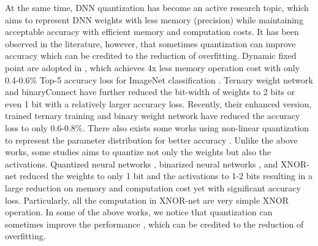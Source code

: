 \documentclass[10pt,twocolumn,letterpaper]{article}
\begin{document}
At the same time, DNN quantization has become an active research topic, which aims to represent DNN weights with less memory (precision) while maintaining acceptable accuracy with efficient memory and computation costs.
It has been observed in the literature, however, that sometimes quantization can improve accuracy which can be credited to the reduction of overfitting.
Dynamic fixed point are adopted in \cite{han2015deep}\cite{hubara2016quantized}, which achieves 4x less memory operation cost with only 0.4-0.6\% Top-5 accuracy loss for ImageNet classification \cite{deng2009imagenet}.
Ternary weight network \cite{li2016ternary} and binaryConnect \cite{courbariaux2015binaryconnect} have further reduced the bit-width of weights to 2 bits or even 1 bit with a relatively larger accuracy loss.
Recently, their enhanced version, trained ternary training \cite{zhu2016trained} and binary weight network \cite{rastegari2016xnor} have reduced the accuracy loss to only 0.6-0.8\%.
There also exists some works using non-linear quantization to represent the parameter distribution for better accuracy \cite{han2015deep}\cite{zhou2017incremental}.
Unlike the above works, some studies aims to quantize not only the weights but also the activations.
Quantized neural networks \cite{hubara2016quantized}, binarized neural networks \cite{courbariauxbinarynet}, and XNOR-net \cite{rastegari2016xnor} reduced the weights to only 1 bit and the activations to 1-2 bits resulting in a large reduction on memory and computation cost yet with significant accuracy loss.
Particularly, all the computation in XNOR-net are very simple XNOR operation.
In some of the above works, we notice that quantization can sometimes improve the performance \cite{han2015deep}\cite{zhou2017incremental}, which can be credited to the reduction of overfitting.
\end{document}

